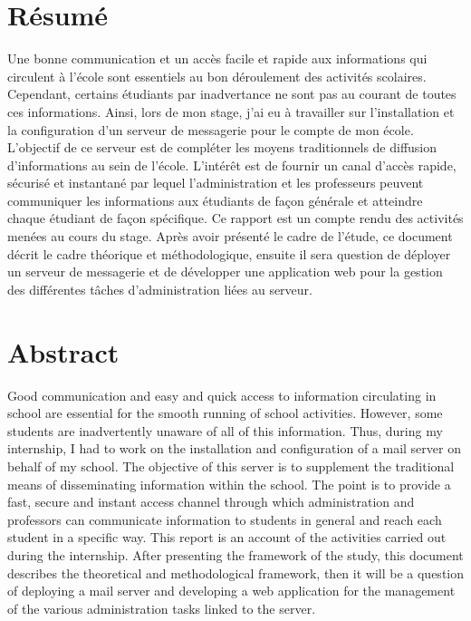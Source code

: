 \documentclass[a4paper,12pt,french]{report} %
\begin{document}
\renewcommand{\contentsname}{Table des matières}

\tableofcontents
{}
\listoffigures


\chapter*{Résumé}
Une bonne communication et un accès facile et rapide aux informations qui circulent à l'école sont  essentiels au bon déroulement des activités scolaires. Cependant, certains étudiants par inadvertance ne sont pas au courant de toutes ces informations. Ainsi, lors de mon stage, j'ai eu à travailler sur l'installation et la configuration d'un serveur de messagerie pour le compte de mon école. L'objectif de ce serveur est de compléter les moyens traditionnels de diffusion d'informations au sein de l'école. L'intérêt est de fournir un canal d'accès rapide, sécurisé et instantané par lequel l'administration et les professeurs peuvent communiquer les informations aux étudiants de façon générale et atteindre chaque étudiant de façon spécifique. Ce rapport est un compte rendu des activités menées au cours du stage. Après avoir présenté le cadre de l'étude, ce document décrit le cadre théorique et méthodologique, ensuite il sera question de déployer un serveur de messagerie et de développer une application web pour la gestion des différentes tâches d'administration liées au serveur.

\chapter*{Abstract}
Good communication and easy and quick access to information circulating in school are essential for the smooth running of school activities. However, some students are inadvertently unaware of all of this information. Thus, during my internship, I had to work on the installation and configuration of a mail server on behalf of my school. The objective of this server is to supplement the traditional means of disseminating information within the school. The point is to provide a fast, secure and instant access channel through which administration and professors can communicate information to students in general and reach each student in a specific way. This report is an account of the activities carried out during the internship. After presenting the framework of the study, this document describes the theoretical and methodological framework, then it will be a question of deploying a mail server and developing a web application for the management of the various administration tasks linked to the server.
\end{document}
